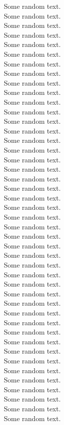 Some random text.\\
Some random text.\\
Some random text.\\
Some random text.\\
Some random text.\\
Some random text.\\
Some random text.\\
Some random text.\\
Some random text.\\
Some random text.\\
Some random text.\\
Some random text.\\
Some random text.\\
Some random text.\\
Some random text.\\
Some random text.\\
Some random text.\\
Some random text.\\
Some random text.\\
Some random text.\\
Some random text.\\
Some random text.\\
Some random text.\\
Some random text.\\
Some random text.\\
Some random text.\\
Some random text.\\
Some random text.\\
Some random text.\\
Some random text.\\
Some random text.\\
Some random text.\\
Some random text.\\
Some random text.\\
Some random text.\\
Some random text.\\
Some random text.\\
Some random text.\\
Some random text.\\
Some random text.\\
Some random text.\\
Some random text.\\
Some random text.\\
Some random text.\\
